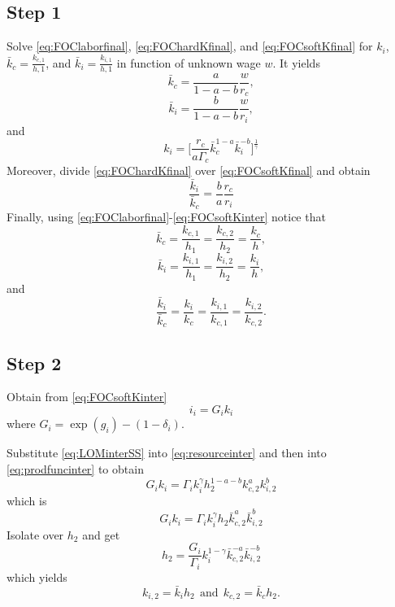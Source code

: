 \documentclass{article}
\begin{document}
\subsection*{Step 1}

Solve \ref{eq:FOClaborfinal}, \ref{eq:FOChardKfinal}, and \ref{eq:FOCsoftKfinal} for $k_i$, $\bar{k}_c = \frac{k_{c,1}}{h,1}$, and $\bar{k}_i = \frac{k_{i,1}}{h,1}$ in function of unknown wage $w$. It yields
\begin{equation}
\bar{k}_c = \frac{a}{1 - a- b}\frac{w}{r_c},
\end{equation}
\begin{equation}
\bar{k}_i = \frac{b}{1 - a- b}\frac{w}{r_i},
\end{equation}
and
\begin{equation}
k_i = \bigg[   \frac{r_c}{a \Gamma_c}   \bar{k}_c^{1-a} \bar{k}_i^{-b}   \bigg]^{\frac{1}{\gamma}}
\end{equation}
Moreover, divide \ref{eq:FOChardKfinal} over \ref{eq:FOCsoftKfinal} and obtain
\begin{equation}
\frac{\bar{k}_i}{\bar{k}_c} = \frac{b}{a} \frac{r_c}{r_i}
\end{equation}
Finally, using \ref{eq:FOClaborfinal}-\ref{eq:FOCsoftKinter} notice that 
$$
\bar{k}_c = \frac{k_{c,1}}{h_1} = \frac{k_{c,2}}{h_2} = \frac{k_{c}}{h},
$$
$$
\bar{k}_i = \frac{k_{i,1}}{h_1} = \frac{k_{i,2}}{h_2} = \frac{k_{i}}{h},
$$
and
$$
\frac{\bar{k}_i}{\bar{k}_c} = \frac{{k}_i}{{k}_c} = \frac{{k}_{i,1}}{{k}_{c,1}} = \frac{{k}_{i,2}}{{k}_{c,2}}.
$$

\subsection*{Step 2}

Obtain from \ref{eq:FOCsoftKinter}
\begin{equation}\label{eq:LOMinterSS}
i_i = G_i k_i 
\end{equation}
where $G_i = \exp(g_i) - (1 - \delta_i)$.

Substitute \ref{eq:LOMinterSS} into \ref{eq:resourceinter} and then into \ref{eq:prodfuncinter} to obtain
$$
G_i k_i = \Gamma_{i} k_{i}^{\gamma} h_{2}^{1 - a- b} k_{c,2}^a k_{i,2}^b
$$
which is
$$
G_i k_i = \Gamma_{i} k_{i}^{\gamma} h_{2} \bar{k}_{c,2}^a \bar{k}_{i,2}^b
$$
Isolate over $h_2$ and get
\begin{equation}
h_2 = \frac{G_i}{\Gamma_i} k_i^{1 - \gamma} \bar{k}_{c,2}^{-a} \bar{k}_{i,2}^{-b}
\end{equation}
which yields
$$
k_{i,2} = \bar{k}_i h_2 \ \ \text{and} \ \ k_{c,2} = \bar{k}_c h_2.
$$
\end{document}
